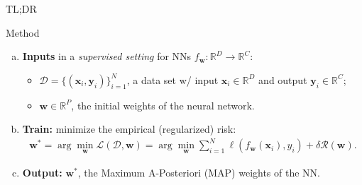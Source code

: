 \documentclass[final,12pt]{beamer}
\newlength{\colwidth}
\newcommand{\mbf}[1]{\mathbf{#1}}
\newcommand{\vx}{\mbf{x}}
\newcommand{\vy}{\mbf{y}}
\newcommand{\R}{\mathbb{R}}
\newcommand{\dataset}{\ensuremath{\mathcal{D}}}
\newcommand{\inputDomain}{\ensuremath{\mathbb{R}^{D}}}
\newcommand{\outputDomain}{\ensuremath{\mathbb{R}^{C}}}
\newcommand{\weights}{\ensuremath{\mathbf{w}}}
\begin{document}
\begin{frame}[t]
\begin{columns}[t]
\begin{column}{\colwidth}
\begin{alertblock}{TL;DR}
  \end{alertblock}

  \begin{block}{Method}


  \begin{enumerate}[(a)]
    \item \alert{\bf Inputs} in a {\it supervised setting} for NNs $f_\mathbf{w}: \inputDomain \to \outputDomain$:\
        \begin{itemize}
        \item $\dataset = \{(\vx_{i} , \vy_{i})\}_{i=1}^{N}$, a data set w/ input $\vx_i \in \inputDomain$ and output $\vy_i \in \outputDomain$;
        \item $\weights \in \R^{P}$, the initial weights of the neural network.
        \end{itemize}
    \item \alert{\bf Train: } minimize the empirical (regularized) risk:
        \begin{align}
        \weights^{*} =  \arg \min_{\weights} \mathcal{L}(\dataset,\weights)
            = \arg \min_{\weights} \textstyle\sum_{i=1}^{N} \ell(f_\weights(\mathbf{x}_{i}), y_i) + \delta \mathcal{R}(\weights).
        \end{align}
    \item \alert{\bf Output:} $\weights^*$, the Maximum A-Posteriori (MAP) weights of the NN.\\[0.5cm]

  \end{enumerate}



\end{block}
\end{column}
\end{columns}
\end{frame}
\end{document}
